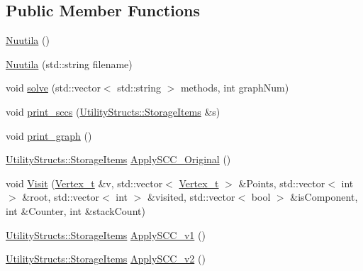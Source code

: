\subsection*{Public Member Functions}
\begin{DoxyCompactItemize}
\item 
\hyperlink{class_nuutila_ab1ae0281145f693a922f5122d27cc23b_ab1ae0281145f693a922f5122d27cc23b}{Nuutila} ()
\item 
\hyperlink{class_nuutila_a00bb9066a5a1c9fb03e25481f4f47a0c_a00bb9066a5a1c9fb03e25481f4f47a0c}{Nuutila} (std\+::string filename)
\item 
void \hyperlink{class_nuutila_ae56bd15d2e57366eef0e044bf3a37d9e_ae56bd15d2e57366eef0e044bf3a37d9e}{solve} (std\+::vector$<$ std\+::string $>$ methods, int graph\+Num)
\item 
void \hyperlink{class_nuutila_ae11b94c396dff5b8d9b7f69ae0d0831f_ae11b94c396dff5b8d9b7f69ae0d0831f}{print\+\_\+sccs} (\hyperlink{struct_utility_structs_1_1_storage_items}{Utility\+Structs\+::\+Storage\+Items} \&s)
\item 
void \hyperlink{class_nuutila_a0dc1cb3d0711a856a32a3743a85fb5c8_a0dc1cb3d0711a856a32a3743a85fb5c8}{print\+\_\+graph} ()
\item 
\hyperlink{struct_utility_structs_1_1_storage_items}{Utility\+Structs\+::\+Storage\+Items} \hyperlink{class_nuutila_a7d52f96cf25409704bfd7bf176fcc7c5_a7d52f96cf25409704bfd7bf176fcc7c5}{Apply\+S\+C\+C\+\_\+\+Original} ()
\item 
void \hyperlink{class_nuutila_a2d43bc514d7375f9d63e60c06f90a60f_a2d43bc514d7375f9d63e60c06f90a60f}{Visit} (\hyperlink{class_graph_component_ae67114a6ce5a001dc35e1996e1b45aa0_ae67114a6ce5a001dc35e1996e1b45aa0}{Vertex\+\_\+t} \&v, std\+::vector$<$ \hyperlink{class_graph_component_ae67114a6ce5a001dc35e1996e1b45aa0_ae67114a6ce5a001dc35e1996e1b45aa0}{Vertex\+\_\+t} $>$ \&Points, std\+::vector$<$ int $>$ \&root, std\+::vector$<$ int $>$ \&visited, std\+::vector$<$ bool $>$ \&is\+Component, int \&Counter, int \&stack\+Count)
\item 
\hyperlink{struct_utility_structs_1_1_storage_items}{Utility\+Structs\+::\+Storage\+Items} \hyperlink{class_nuutila_a6c355594f68dad8c28684114a6df6700_a6c355594f68dad8c28684114a6df6700}{Apply\+S\+C\+C\+\_\+v1} ()
\item 
\hyperlink{struct_utility_structs_1_1_storage_items}{Utility\+Structs\+::\+Storage\+Items} \hyperlink{class_nuutila_a291d578f760e0f11a5c56c8a5fe02ebd_a291d578f760e0f11a5c56c8a5fe02ebd}{Apply\+S\+C\+C\+\_\+v2} ()
\item 

\end{DoxyCompactItemize}
